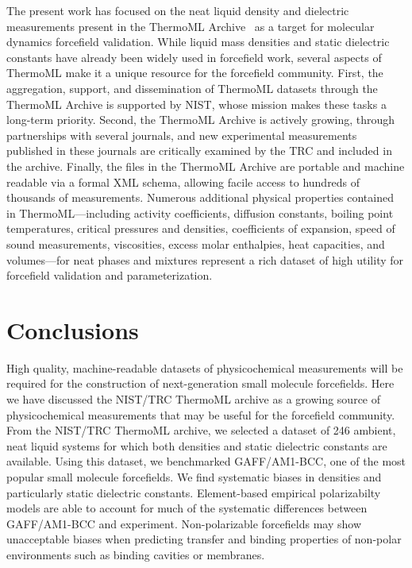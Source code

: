 \documentclass[aps,pre,twocolumn,nofootinbib,superscriptaddress,linenumbers]{revtex4-1}
\begin{document}
The present work has focused on the neat liquid density and dielectric measurements present in the ThermoML Archive~\cite{frenkel2006xml, frenkel2003thermoml, chirico2003thermoml} as a target for molecular dynamics forcefield validation.  
While liquid mass densities and static dielectric constants have already been widely used in forcefield work, several aspects of ThermoML make it a unique resource for the forcefield community.  
First, the aggregation, support, and dissemination of ThermoML datasets through the ThermoML Archive is supported by NIST, whose mission makes these tasks a long-term priority.  
Second, the ThermoML Archive is actively growing, through partnerships with several journals, and new experimental measurements published in these journals are critically examined by the TRC and included in the archive.  
Finally, the files in the ThermoML Archive are portable and machine readable via a formal XML schema, allowing facile access to hundreds of thousands of measurements.  
Numerous additional physical properties contained in ThermoML---including activity coefficients, diffusion constants, boiling point temperatures, critical pressures and densities, coefficients of expansion, speed of sound measurements, viscosities, excess molar enthalpies, heat capacities, and volumes---for neat phases and mixtures represent a rich dataset of high utility for forcefield validation and parameterization.


\section{Conclusions}

High quality, machine-readable datasets of physicochemical measurements will be required for the construction of next-generation small molecule forcefields.  
Here we have discussed the NIST/TRC ThermoML archive as a growing source of physicochemical measurements that may be useful for the forcefield community.
From the NIST/TRC ThermoML archive, we selected a dataset of 246 ambient, neat liquid systems for which both densities and static dielectric constants are available.  
Using this dataset, we benchmarked GAFF/AM1-BCC, one of the most popular small molecule forcefields.
We find systematic biases in densities and particularly static dielectric constants.
Element-based empirical polarizabilty models are able to account for much of the systematic differences between GAFF/AM1-BCC and experiment.  
Non-polarizable forcefields may show unacceptable biases when predicting transfer and binding properties of non-polar environments such as binding cavities or membranes.  
\end{document}
